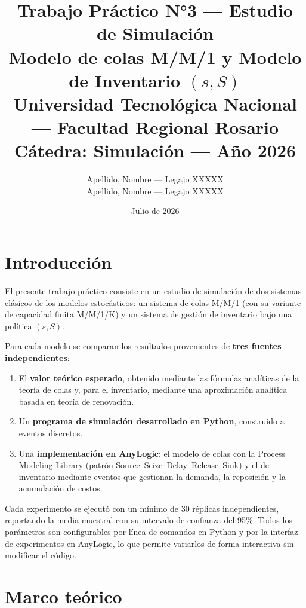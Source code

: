 \documentclass[11pt,a4paper]{article}
\title{
    \textbf{Trabajo Práctico N°3 — Estudio de Simulación} \\
    \large Modelo de colas M/M/1 y Modelo de Inventario $(s,S)$ \\
    \vspace{0.3cm}
    \normalsize Universidad Tecnológica Nacional — Facultad Regional Rosario \\
    Cátedra: Simulación — Año 2026
}
\author{
    Apellido, Nombre — Legajo XXXXX \\
    Apellido, Nombre — Legajo XXXXX
}
\date{Julio de 2026}
\begin{document}
\maketitle
\tableofcontents
\newpage

\section{Introducción}

El presente trabajo práctico consiste en un estudio de simulación de dos
sistemas clásicos de los modelos estocásticos: un sistema de colas M/M/1
(con su variante de capacidad finita M/M/1/K) y un sistema de gestión de
inventario bajo una política $(s,S)$.

Para cada modelo se comparan los resultados provenientes de \textbf{tres
fuentes independientes}:

\begin{enumerate}
    \item El \textbf{valor teórico esperado}, obtenido mediante las fórmulas
          analíticas de la teoría de colas y, para el inventario, mediante
          una aproximación analítica basada en teoría de renovación.
    \item Un \textbf{programa de simulación desarrollado en Python},
          construido a eventos discretos.
    \item Una \textbf{implementación en AnyLogic}: el modelo de colas con la
          Process Modeling Library (patrón Source--Seize--Delay--Release--Sink)
          y el de inventario mediante eventos que gestionan la demanda, la
          reposición y la acumulación de costos.
\end{enumerate}

Cada experimento se ejecutó con un mínimo de 30 réplicas independientes,
reportando la media muestral con su intervalo de confianza del 95\%. Todos
los parámetros son configurables por línea de comandos en Python y por la
interfaz de experimentos en AnyLogic, lo que permite variarlos de forma
interactiva sin modificar el código.

\section{Marco teórico}
\end{document}
